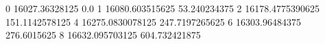 0 16027.36328125 0.0
1 16080.603515625 53.240234375
2 16178.4775390625 151.1142578125
4 16275.0830078125 247.7197265625
6 16303.96484375 276.6015625
8 16632.095703125 604.732421875
